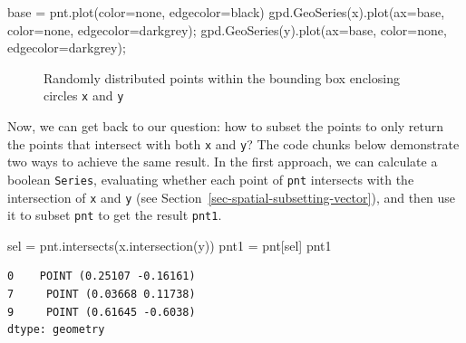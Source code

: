 \documentclass[
  letterpaper,
]{krantz}
\newenvironment{Shaded}{\begin{snugshade}}{\end{snugshade}}
\newcommand{\NormalTok}[1]{\textcolor[rgb]{0.00,0.23,0.31}{#1}}
\newcommand{\OperatorTok}[1]{\textcolor[rgb]{0.37,0.37,0.37}{#1}}
\newcommand{\StringTok}[1]{\textcolor[rgb]{0.13,0.47,0.30}{#1}}
\begin{document}
\begin{Shaded}
\begin{Highlighting}[]
\NormalTok{base }\OperatorTok{=}\NormalTok{ pnt.plot(color}\OperatorTok{=}\StringTok{\textquotesingle{}none\textquotesingle{}}\NormalTok{, edgecolor}\OperatorTok{=}\StringTok{\textquotesingle{}black\textquotesingle{}}\NormalTok{)}
\NormalTok{gpd.GeoSeries(x).plot(ax}\OperatorTok{=}\NormalTok{base, color}\OperatorTok{=}\StringTok{\textquotesingle{}none\textquotesingle{}}\NormalTok{, edgecolor}\OperatorTok{=}\StringTok{\textquotesingle{}darkgrey\textquotesingle{}}\NormalTok{)}\OperatorTok{;}
\NormalTok{gpd.GeoSeries(y).plot(ax}\OperatorTok{=}\NormalTok{base, color}\OperatorTok{=}\StringTok{\textquotesingle{}none\textquotesingle{}}\NormalTok{, edgecolor}\OperatorTok{=}\StringTok{\textquotesingle{}darkgrey\textquotesingle{}}\NormalTok{)}\OperatorTok{;}
\end{Highlighting}
\end{Shaded}

\begin{figure}[H]


\caption{\label{fig-random-points}Randomly distributed points within the
bounding box enclosing circles \texttt{x} and \texttt{y}}

\end{figure}%

Now, we can get back to our question: how to subset the points to only
return the points that intersect with both \texttt{x} and \texttt{y}?
The code chunks below demonstrate two ways to achieve the same result.
In the first approach, we can calculate a boolean \texttt{Series},
evaluating whether each point of \texttt{pnt} intersects with the
intersection of \texttt{x} and \texttt{y} (see
Section~\ref{sec-spatial-subsetting-vector}), and then use it to subset
\texttt{pnt} to get the result \texttt{pnt1}.

\begin{Shaded}
\begin{Highlighting}[]
\NormalTok{sel }\OperatorTok{=}\NormalTok{ pnt.intersects(x.intersection(y))}
\NormalTok{pnt1 }\OperatorTok{=}\NormalTok{ pnt[sel]}
\NormalTok{pnt1}
\end{Highlighting}
\end{Shaded}

\begin{verbatim}
0    POINT (0.25107 -0.16161)
7     POINT (0.03668 0.11738)
9     POINT (0.61645 -0.6038)
dtype: geometry
\end{verbatim}
\end{document}
